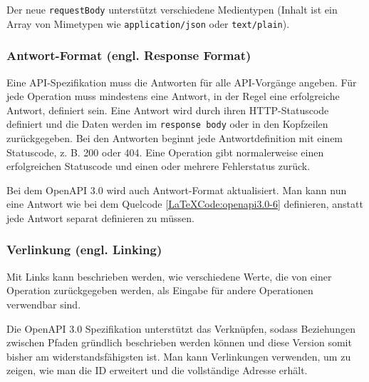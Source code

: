 Der neue \texttt{requestBody} unterstützt verschiedene Medientypen (Inhalt ist ein Array von Mimetypen wie \texttt{application/json} oder \texttt{text/plain}).

\subsubsection{Antwort-Format (engl. Response Format)}

Eine API-Spezifikation muss die Antworten für alle API-Vorgänge angeben. Für jede Operation muss mindestens eine Antwort, in der Regel eine erfolgreiche Antwort, definiert sein. Eine Antwort wird durch ihren HTTP-Statuscode definiert und die Daten werden im \texttt{response body} oder in den Kopfzeilen zurückgegeben. Bei den Antworten beginnt jede Antwortdefinition mit einem Statuscode, z. B. 200 oder 404. Eine Operation gibt normalerweise einen erfolgreichen Statuscode und einen oder mehrere Fehlerstatus zurück\cite{openapiresponsebody17}.

Bei dem OpenAPI 3.0 wird  auch Antwort-Format aktualisiert. Man kann nun eine Antwort wie bei dem Quelcode \ref{LaTeXCode:openapi3.0-6} definieren, anstatt jede Antwort separat definieren zu müssen.

\begin{LaTeXCode}[caption={Open API 3.0 - Antwort-Format},captionpos=b, label=LaTeXCode:openapi3.0-6][numbers=none]
{
	"meinBeispiel": {
		"\$request.body#/url": null,
		"post": {
			"requestBody": {
				"description": "antwort beispiel",
				"content": null,
				"application/json": {
					"schema": null,
					"\$ref": "#/components/schemas/antwortbeispiel"
				},
				"responses": {
					"200": null,
					"description": "antwort funktioniert."
				}
...
\end{LaTeXCode}


\subsubsection{Verlinkung (engl. Linking)}

Mit Links kann beschrieben werden, wie verschiedene Werte, die von einer Operation zurückgegeben werden, als Eingabe für andere Operationen verwendbar sind\cite{openapilinks17}.


Die OpenAPI 3.0 Spezifikation unterstützt das Verknüpfen, sodass Beziehungen zwischen Pfaden gründlich beschrieben werden können und diese Version somit bisher am widerstandsfähigsten ist. Man kann Verlinkungen verwenden, um zu zeigen, wie man die ID erweitert und die vollständige Adresse erhält.

